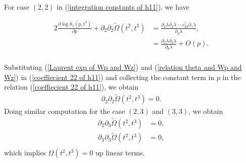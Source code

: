 \documentclass{article}
\theoremstyle{definition}
\begin{document}
For case $(2,2)$ in (\ref{integration constants of h11}), we have 


 \begin{equation}\label{coeffiecient 22 of h11}
 \begin{split}
2\frac{\partial \log\theta_1(p,t^3)}{\partial p}+\partial_2\partial_2\tilde\Omega(t^2,t^3)&= \frac{ \partial_{2}\lambda \partial_{2}\lambda -c_{22}^{\gamma}\partial_{\gamma}\lambda}{ \partial_{p}\lambda},\\
&= \frac{ \partial_{2}\lambda \partial_{2}\lambda }{ \partial_{p}\lambda}+O(p).\\
\end{split}
\end{equation}

Substituting (\ref{Laurent exp of Wp and Wz}) and (\ref{relation theta and Wp and Wz}) in (\ref{coeffiecient 22 of h11}) and collecting the constant term in $p$ in the relation (\ref{coeffiecient 22 of h11}), we obtain
\begin{equation*}
\begin{split}
\partial_2\partial_2\tilde\Omega(t^2,t^3)=0.
\end{split}
\end{equation*}
Doing similar computation for the case $(2,3)$ and $(3,3)$, we obtain
\begin{equation*}
\begin{split}
\partial_2\partial_3\tilde\Omega(t^2,t^3)&=0,\\
\partial_3\partial_3\tilde\Omega(t^2,t^3)&=0,\\
\end{split}
\end{equation*}
which implies $\Omega(t^2,t^3)=0$ up linear terms.


%
\end{document}
